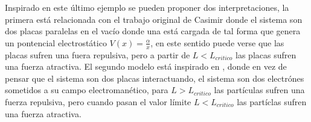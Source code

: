 Inspirado en este último ejemplo se pueden proponer dos interpretaciones, la primera está relacionada con el trabajo original de Casimir \cite{Casimir:1948dh} donde el sistema son dos placas paralelas en el vacío donde una está cargada de tal forma que genera un pontencial electrostático $V (x) = \frac{\alpha}{x}$, en este sentido puede verse que las placas sufren una fuera repulsiva, pero a partir de  $L < L _{critico}$ las placas sufren una fuerza atractiva. El segundo modelo está inspirado en \cite{MILTON198049}, donde en vez de pensar que el sistema son dos placas interactuando, el sistema son dos electrónes sometidos a su campo electromanético, para $L > L _{critico}$ las partículas sufren una fuerza repulsiva, pero cuando pasan el valor límite $L < L _{critico}$ las partíclas sufren una fuerza atractiva.

